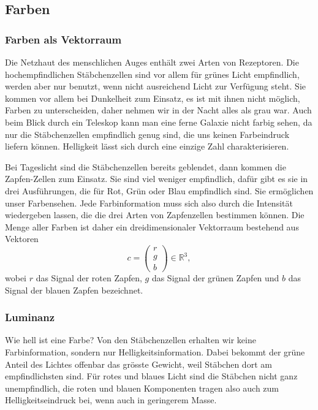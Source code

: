%
%
%
\subsection{Farben}
\subsubsection{Farben als Vektorraum}
Die Netzhaut des menschlichen Auges enthält zwei Arten von Rezeptoren.
Die hochempfindlichen Stäbchenzellen sind vor allem für grünes Licht
empfindlich, werden aber nur benutzt, wenn nicht ausreichend Licht
zur Verfügung steht.
Sie kommen vor allem bei Dunkelheit zum Einsatz, es ist mit ihnen
nicht möglich, Farben zu unterscheiden, daher nehmen wir in der
Nacht alles als grau war.
Auch beim Blick durch ein Teleskop kann man eine ferne Galaxie nicht
farbig sehen, da nur die Stäbchenzellen empfindlich genug sind, die
uns keinen Farbeindruck liefern können. Helligkeit lässt sich durch
eine einzige Zahl charakterisieren.

Bei Tageslicht sind die Stäbchenzellen
bereits geblendet, dann kommen die Zapfen-Zellen zum Einsatz.
Sie sind viel weniger empfindlich, dafür gibt es sie in drei Ausführungen,
die für Rot, Grün oder Blau empfindlich sind.
Sie ermöglichen unser Farbensehen.
Jede Farbinformation muss sich also durch die Intensität wiedergeben
lassen, die die drei Arten von Zapfenzellen bestimmen können.
Die Menge aller Farben ist daher ein dreidimensionaler Vektorraum
bestehend aus Vektoren
\[
c=\begin{pmatrix}r\\g\\b\end{pmatrix}
\in\mathbb R^3,
\]
wobei $r$ das Signal der roten Zapfen, $g$ das Signal der grünen Zapfen
und $b$ das Signal der blauen Zapfen bezeichnet.

\subsubsection{Luminanz}
Wie hell ist eine Farbe?
Von den Stäbchenzellen erhalten wir keine
Farbinformation, sondern nur Helligkeitsinformation.
Dabei bekommt der grüne Anteil des Lichtes offenbar das
grösste Gewicht, weil Stäbchen dort am empfindlichsten sind.
Für rotes und blaues Licht sind die Stäbchen nicht ganz unempfindlich,
die roten und blauen Komponenten tragen also auch zum Helligkeitseindruck
bei, wenn auch in geringerem Masse.

